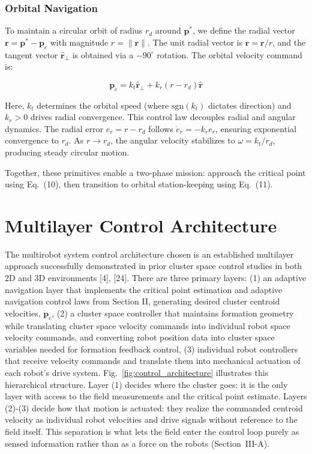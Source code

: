 \documentclass[lettersize,journal]{IEEEtran}
\begin{document}
\subsubsection{Orbital Navigation}
To maintain a circular orbit of radius $r_d$ around $\mathbf{p}^*$, we define the radial vector $\mathbf{r} = \mathbf{p}^* - \mathbf{p}_c$ with magnitude $r = \|\mathbf{r}\|$. The unit radial vector is $\hat{\mathbf{r}} = \mathbf{r}/r$, and the tangent vector $\hat{\mathbf{r}}_\perp$ is obtained via a $-90^\circ$ rotation. The orbital velocity command is:

\begin{equation}
\dot{\mathbf{p}}_c = k_t \hat{\mathbf{r}}_\perp + k_r(r - r_d)\hat{\mathbf{r}}
\end{equation}

Here, $k_t$ determines the orbital speed (where $\text{sgn}(k_t)$ dictates direction) and $k_r > 0$ drives radial convergence.
This control law decouples radial and angular dynamics. The radial error $e_r = r - r_d$ follows $\dot{e}_r = -k_r e_r$, ensuring exponential convergence to $r_d$. As $r \to r_d$, the angular velocity stabilizes to $\omega = k_t/r_d$, producing steady circular motion.

Together, these primitives enable a two-phase mission: approach the critical point using Eq.~(10), then transition to orbital station-keeping using Eq.~(11).

\section{Multilayer Control Architecture}


The multirobot system control architecture chosen is an established multilayer approach successfully demonstrated in prior cluster space control studies in both 2D and 3D environments [4], [24]. There are three primary layers: (1) an adaptive navigation layer that implements the critical point estimation and adaptive navigation control laws from Section II, generating desired cluster centroid velocities, $\dot{\mathbf{p}}_c$, (2) a cluster space controller that maintains formation geometry while translating cluster space velocity commands into individual robot space velocity commands, and converting robot position data into cluster space variables needed for formation feedback control, (3) individual robot controllers that receive velocity commands and translate them into mechanical actuation of each robot's drive system. Fig.~\ref{fig:control_architecture} illustrates this hierarchical structure. Layer (1) decides where the cluster goes: it is the only layer with access to the field measurements and the critical point estimate. Layers (2)-(3) decide how that motion is actuated: they realize the commanded centroid velocity as individual robot velocities and drive signals without reference to the field itself. This separation is what lets the field enter the control loop purely as sensed information rather than as a force on the robots (Section~III-A).
\end{document}
